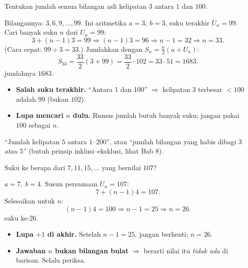 \begin{soalbox}{}
Tentukan jumlah semua bilangan asli kelipatan $3$ antara $1$ dan $100$.
\end{soalbox}

\jawab
{} Bilangannya: $3,6,9,\dots,99$. Ini aritmetika $a=3,\ b=3$, suku
terakhir $U_n=99$.
 Cari banyak suku $n$ dari $U_n=99$:
\[
3+(n-1)3=99 \Rightarrow (n-1)3=96 \Rightarrow n-1=32 \Rightarrow n=33.
\]
(Cara cepat: $99\div3=33$.)
 Jumlahkan dengan $S_n=\frac n2(a+U_n)$:
\[
S_{33}=\frac{33}{2}(3+99)=\frac{33}{2}\cdot102=33\cdot51=1683.
\]
\jadi jumlahnya $1683$.

\begin{jebakan}
\begin{itemize}[leftmargin=*,topsep=2pt]
  \item \textbf{Salah suku terakhir.} ``Antara 1 dan 100'' $\Rightarrow$ kelipatan
  3 terbesar $<100$ adalah $99$ (bukan $102$).
  \item \textbf{Lupa mencari $n$ dulu.} Rumus jumlah butuh banyak suku; jangan
  pakai $100$ sebagai $n$.
\end{itemize}
\end{jebakan}

\begin{variasi}
``Jumlah kelipatan $5$ antara $1$--$200$'', atau ``jumlah bilangan yang habis
dibagi $3$ \emph{atau} $5$'' (butuh prinsip inklusi--eksklusi, lihat Bab 8).
\end{variasi}

\begin{soalbox}{}
Suku ke berapa dari $7,11,15,\dots$ yang bernilai $107$?
\end{soalbox}

\jawab
{} $a=7,\ b=4$. Susun persamaan $U_n=107$:
\[
7+(n-1)4=107.
\]
 Selesaikan untuk $n$:
\[
(n-1)4=100 \Rightarrow n-1=25 \Rightarrow n=26.
\]
\jadi suku ke-26.

\begin{jebakan}
\begin{itemize}[leftmargin=*,topsep=2pt]
  \item \textbf{Lupa $+1$ di akhir.} Setelah $n-1=25$, jangan berhenti; $n=26$.
  \item \textbf{Jawaban $n$ bukan bilangan bulat} $\Rightarrow$ berarti nilai itu
  \emph{tidak ada} di barisan. Selalu periksa.
\end{itemize}
\end{jebakan}

